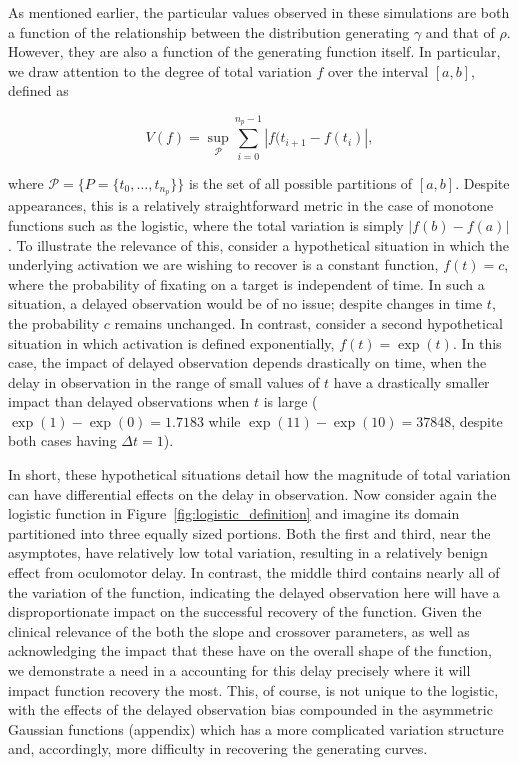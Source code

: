As mentioned earlier, the particular values observed in these simulations are both a function of the relationship between the distribution generating $\gamma$ and that of $\rho$. However, they are also a function of the generating function itself. In particular, we draw attention to the degree of total variation $f$ over the interval $[a,b]$, defined as 

\begin{equation}
V(f) = \underset{\mathcal{P}}{\sup} \sum_{i=0}^{n_p-1} \left|f(t_{i+1} - f(t_i) \right|,
\end{equation}

where $\mathcal{P} = \{P = \{t_0, \dots, t_{n_p}\} \}$ is the set of all possible partitions of $[a,b]$. Despite appearances, this is a relatively straightforward metric in the case of monotone functions such as the logistic, where the total variation is simply $|f(b) - f(a)|$. To illustrate the relevance of this, consider a hypothetical situation in which the underlying activation we are wishing to recover is a constant function, $f(t) = c$, where the probability of fixating on a target is independent of time. In such a situation, a delayed observation would be of no issue; despite changes in time $t$, the probability $c$ remains unchanged. In contrast, consider a second hypothetical situation in which activation is defined exponentially, $f(t) = \exp(t)$. In this case, the impact of delayed observation depends drastically on time, when the delay in observation in the range of small values of $t$ have a drastically smaller impact than delayed observations when $t$ is large ($\exp(1) - \exp(0) = 1.7183$ while $\exp(11) - \exp(10) = 37848$, despite both cases having $\Delta t = 1$).

In short, these hypothetical situations detail how the magnitude of total variation can have differential effects on the delay in observation. Now consider again the logistic function in Figure~\ref{fig:logistic_definition} and imagine its domain partitioned into three equally sized portions. Both the first and third, near the asymptotes, have relatively low total variation, resulting in a relatively benign effect from oculomotor delay. In contrast, the middle third contains nearly all of the variation of the function, indicating the delayed observation here will have a disproportionate impact on the successful recovery of the function. Given the clinical relevance of the both the slope and crossover parameters, as well as acknowledging the impact that these have on the overall shape of the function, we demonstrate a need in a accounting for this delay precisely where it will impact function recovery the most. This, of course, is not unique to the logistic, with the effects of the delayed observation bias compounded in the asymmetric Gaussian functions (appendix) which has a more complicated variation structure and, accordingly, more difficulty in recovering the generating curves.


